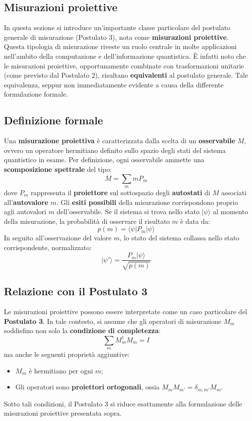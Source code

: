 \documentclass[a4paper,12pt]{report}
\theoremstyle{plain}
\begin{document}
\subsection{Misurazioni proiettive}
In questa sezione si introduce un'importante classe particolare del postulato generale di misurazione (Postulato 3), nota come \textbf{misurazioni proiettive}. Questa tipologia di misurazione riveste un ruolo centrale in molte applicazioni nell'ambito della computazione e dell'informazione quantistica. È infatti noto che le misurazioni proiettive, opportunamente combinate con trasformazioni unitarie (come previsto dal Postulato 2), risultano \textbf{equivalenti} al postulato generale. Tale equivalenza, seppur non immediatamente evidente a causa della differente formulazione formale.
\subsection*{Definizione formale}
Una \textbf{misurazione proiettiva} è caratterizzata dalla scelta di un \textbf{osservabile} $M$, ovvero un operatore hermitiano definito sullo spazio degli stati del sistema quantistico in esame. Per definizione, ogni osservabile ammette una \textbf{scomposizione spettrale} del tipo:
\[ M = \sum_m m P_m \]
dove $P_m$ rappresenta il \textbf{proiettore} sul sottospazio degli \textbf{autostati} di $M$ associati all'\textbf{autovalore} $m$. Gli \textbf{esiti possibili} della misurazione corrispondono proprio agli autovalori $m$ dell'osservabile.
Se il sistema si trova nello stato $|\psi\rangle$ al momento della misurazione, la probabilità di osservare il risultato $m$ è data da:
\[ p(m) = \langle \psi | P_m | \psi \rangle \]
In seguito all'osservazione del valore $m$, lo stato del sistema collassa nello stato corrispondente, normalizzato:
\[ |\psi'\rangle = \frac{P_m |\psi\rangle}{\sqrt{p(m)}} \]
\subsection*{Relazione con il Postulato 3}
Le misurazioni proiettive possono essere interpretate come un caso particolare del \textbf{Postulato 3}. In tale contesto, si assume che gli operatori di misurazione $M_m$ soddisfino non solo la \textbf{condizione di completezza}:
\[ \sum_m M_m^\dagger M_m = I \]
ma anche le seguenti proprietà aggiuntive:
\begin{itemize}
    \item $M_m$ è hermitiano per ogni $m$;
    \item Gli operatori sono \textbf{proiettori ortogonali}, ossia $M_m M_{m'} = \delta_{m,m'} M_m$.
\end{itemize}
Sotto tali condizioni, il Postulato 3 si riduce esattamente alla formulazione delle misurazioni proiettive presentata sopra.
\end{document}
